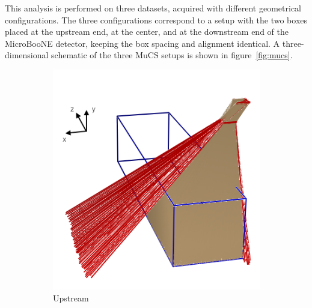 \documentclass[a4paper,11pt]{article}
\begin{document}
This analysis is performed on three datasets, acquired with different geometrical configurations. The three configurations correspond to a setup with the two boxes placed at the upstream end, at the center, and at the downstream end of the MicroBooNE detector, keeping the box spacing and alignment identical.
A three-dimensional schematic of the three MuCS setups is shown in figure~\ref{fig:mucs}.

\begin{figure}[htbp]
  \begin{subfigure}{0.30\textwidth}
    \includegraphics[width=\linewidth]{figures/upstream.png}
    \caption{Upstream} \label{fig:upstream}
  \end{subfigure}
  \begin{subfigure}{0.30\textwidth}

\end{subfigure}
\end{figure}
\end{document}
